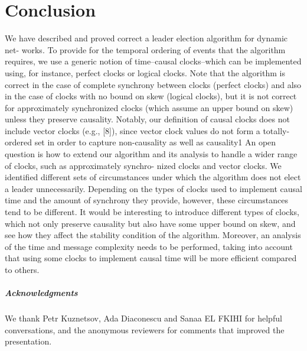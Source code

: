\chapter{Conclusion}

We have described and proved correct a leader election algorithm for dynamic net- works. To provide for the temporal ordering of events that the algorithm requires, we use a generic notion of time–causal clocks–which can be implemented using, for instance, perfect clocks or logical clocks. Note that the algorithm is correct in the case of complete synchrony between clocks (perfect clocks) and also in the case of clocks with no bound on skew (logical clocks), but it is not correct for approximately synchronized clocks (which assume an upper bound on skew) unless they preserve causality. Notably, our definition of causal clocks does not include vector clocks (e.g., [8]), since vector clock values do not form a totally-ordered set in order to capture non-causality as well as causality1 An open question is how to extend our algorithm and its analysis to handle a wider range of clocks, such as approximately synchro- nized clocks and vector clocks. We identified different sets of circumstances under which the algorithm does not elect a leader unnecessarily. Depending on the types of clocks used to implement causal time and the amount of synchrony they provide, however, these circumstances tend to be different. It would be interesting to introduce different types of clocks, which not only preserve causality but also have some upper bound on skew, and see how they affect the stability condition of the algorithm. Moreover, an analysis of the time and message complexity needs to be performed, taking into account that using some clocks to implement causal time will be more efficient compared to others.

\paragraph{Acknowledgments}We thank Petr Kuznetsov, Ada Diaconescu and Sanaa EL FKIHI for helpful conversations, and the anonymous reviewers for comments that improved the presentation.


